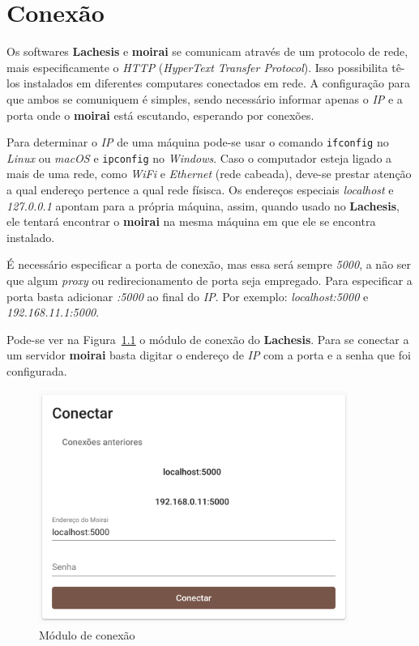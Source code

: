 
\chapter{Conexão}%
\label{chapter:connection}

Os softwares \textbf{Lachesis} e \textbf{moirai} se comunicam através de um
protocolo de rede, mais especificamente o \textit{HTTP} (\textit{HyperText
Transfer Protocol}). Isso possibilita tê-los instalados em diferentes computares
conectados em rede. A configuração para que ambos se comuniquem é simples, sendo
necessário informar apenas o \textit{IP} e a porta onde o \textbf{moirai} está
escutando, esperando por conexões.

Para determinar o \textit{IP} de uma máquina pode-se usar o comando
\texttt{ifconfig} no \textit{Linux} ou \textit{macOS} e
\texttt{ipconfig} no \textit{Windows}. Caso o computador esteja ligado
a mais de uma rede, como \textit{WiFi} e \textit{Ethernet} (rede cabeada),
deve-se prestar atenção a qual endereço pertence a qual rede físisca. Os
endereços especiais \textit{localhost} e \textit{127.0.0.1} apontam para a
própria máquina, assim, quando usado no \textbf{Lachesis}, ele tentará encontrar
o \textbf{moirai} na mesma máquina em que ele se encontra instalado.

É necessário especificar a porta de conexão, mas essa será sempre \textit{5000},
a não ser que algum \textit{proxy} ou redirecionamento de porta seja empregado.
Para especificar a porta basta adicionar \textit{:5000} ao final do \textit{IP}.
Por exemplo: \textit{localhost:5000} e \textit{192.168.11.1:5000}.

Pode-se ver na Figura~\ref{fig:connect} o módulo de conexão do
\textbf{Lachesis}. Para se conectar a um servidor \textbf{moirai} basta digitar
o endereço de \textit{IP} com a porta e a senha que foi configurada.

\begin{figure}[ht!]
    \centering
    \includegraphics[width=0.9\textwidth]{imgs/connect}
    \caption[Módulo de conexão]{Módulo de conexão}%
    \label{fig:connect}
\end{figure}


